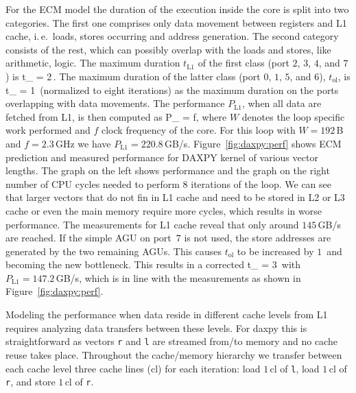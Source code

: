 For the ECM model the duration of the execution inside the core is split into
two categories.
The first one comprises only data movement between registers and L1 cache,
i.\,e.\ loads, stores occurring and address generation.
The second category consists of the rest, which can possibly overlap with the
loads and stores, like arithmetic, logic.
The maximum duration $t_\text{L1}$ of the first class (port $2$, $3$, $4$, and $7$) is
\be
  t_ = 2\,\cyw.
\ee
The maximum duration of the latter class (port $0$, $1$, $5$, and $6$), $t_\text{ol}$, is
\be
  t_ = 1\,\cyw
\ee
%
(normalized to eight iterations) as the maximum duration on the ports overlapping with data
movements.
%
%
%
The performance $P_\text{L1}$, when all data are fetched from L1, is then
computed as 
%
\be
  P_ =  f,
\ee
%
where $W$ denotes the loop specific work performed and $f$ clock
frequency of the core.
For this loop with $W=192$\,B and $f=2.3$\,GHz we have $P_\text{L1} =
220.8$\,GB/s.
Figure~\ref{fig:daxpy:perf} shows ECM prediction and measured performance for DAXPY kernel of various vector lengths. The graph on the left shows performance and the graph on the right number of CPU cycles needed to perform 8 iterations of the loop. We can see that larger vectors that do not fin in L1 cache and need to be stored in L2 or L3 cache or even the main memory require more cycles, which results in worse performance.
The measurements for L1 cache reveal that only around
$145$\,GB/s are reached.
If the simple AGU on port~$7$ is not used, the store addresses are
generated by the two remaining AGUs.
This causes $t_\text{ol}$ to be increased by $1$\,\cyw{} and becoming the new
bottleneck.
This results in a corrected
%
\be
   t_ = 3\,\cyw
\ee
%
with $P_\text{L1} = 147.2$\,GB/s, which is in line with the measurements as shown in Figure~\ref{fig:daxpy:perf}.


Modeling the performance when data reside in different cache levels from L1
requires analyzing data transfers between these levels.
For daxpy this is straightforward as vectors \verb'r' and \verb'l' are
streamed from/to memory and no cache reuse takes place.
Throughout the cache/memory hierarchy we transfer between each cache level three 
cache lines (cl) for each iteration: load $1$\,cl of \verb'l', load $1$\,cl of
\verb'r', and store $1$\,cl of \verb'r'.

